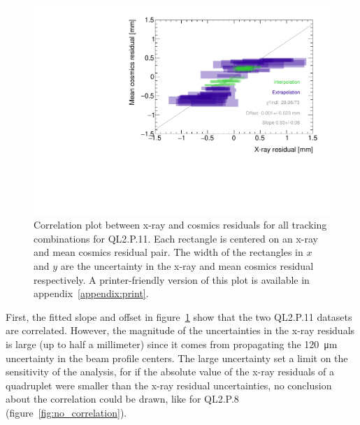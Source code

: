 \begin{figure}
    \centering
    \includegraphics[width = \textwidth]{figures/figure_QL2P11_3100V_2021-08-05_QL2P11_local_cosmic_and_xray_data_correlation_plot.pdf}
    \caption{Correlation plot between x-ray and cosmics residuals for all tracking combinations for QL2.P.11. Each rectangle is centered on an x-ray and mean cosmics residual pair. The width of the rectangles in $x$ and $y$ are the uncertainty in the x-ray and mean cosmics residual respectively. A printer-friendly version of this plot is available in appendix~\ref{appendix:print}.}
    \label{fig:correlation}
\end{figure}

First, the fitted slope and offset in figure~\ref{fig:correlation} show that the two QL2.P.11 datasets are correlated. However, the magnitude of the uncertainties in the x-ray residuals is large (up to half a millimeter) since it comes from propagating the \SI{120}{\micro\meter} uncertainty in the beam profile centers. The large uncertainty set a limit on the sensitivity of the analysis, for if the absolute value of the x-ray residuals of a quadruplet were smaller than the x-ray residual uncertainties, no conclusion about the correlation could be drawn, like for QL2.P.8 (figure~\ref{fig:no_correlation}).

